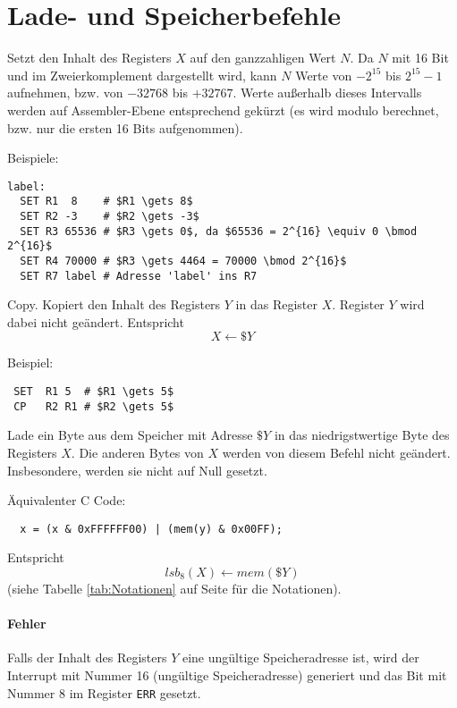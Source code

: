 \section{Lade- und Speicherbefehle}
\label{sec:Lade-Speicher-Instruktionen}

Setzt den Inhalt des Registers $X$ auf den ganzzahligen Wert $N$.
Da $N$ mit 16 Bit und im Zweierkomplement dargestellt wird, kann $N$ Werte von
$-2^{15}$ bis $2^{15} - 1$ aufnehmen, bzw. von $-32768$ bis $+32767$.
Werte außerhalb dieses Intervalls werden auf Assembler-Ebene entsprechend
gekürzt (es wird modulo berechnet, bzw. nur die ersten 16 Bits aufgenommen).

Beispiele:
\begin{lstlisting}
label:
  SET R1  8    # $R1 \gets 8$
  SET R2 -3    # $R2 \gets -3$
  SET R3 65536 # $R3 \gets 0$, da $65536 = 2^{16} \equiv 0 \bmod 2^{16}$
  SET R4 70000 # $R3 \gets 4464 = 70000 \bmod 2^{16}$
  SET R7 label # Adresse 'label' ins R7
\end{lstlisting}


\glqq Copy\grqq.
Kopiert den Inhalt des Registers $Y$ in das Register $X$. Register $Y$ wird
dabei nicht geändert. Entspricht
\[
    X \gets \$Y
\]

Beispiel:
\begin{lstlisting}
 SET  R1 5  # $R1 \gets 5$
 CP   R2 R1 # $R2 \gets 5$
\end{lstlisting}



Lade ein Byte aus dem Speicher mit Adresse $\$Y$ in das niedrigstwertige
Byte des Registers $X$. Die anderen Bytes von $X$ werden von diesem Befehl nicht
geändert. Insbesondere, werden sie nicht auf Null gesetzt.

Äquivalenter C Code:
\begin{lstlisting}
  x = (x & 0xFFFFFF00) | (mem(y) & 0x00FF);
\end{lstlisting}

Entspricht 
\[
  lsb_{8}(X) \gets mem(\$Y)
\]
(siehe Tabelle \ref{tab:Notationen} auf Seite \pageref{tab:Notationen} für die
Notationen).

\paragraph{Fehler}
Falls der Inhalt des Registers $Y$ eine ungültige Speicheradresse ist, wird der
Interrupt mit Nummer 16 (ungültige Speicheradresse) generiert und das Bit mit
Nummer 8 im Register \texttt{ERR} gesetzt.


